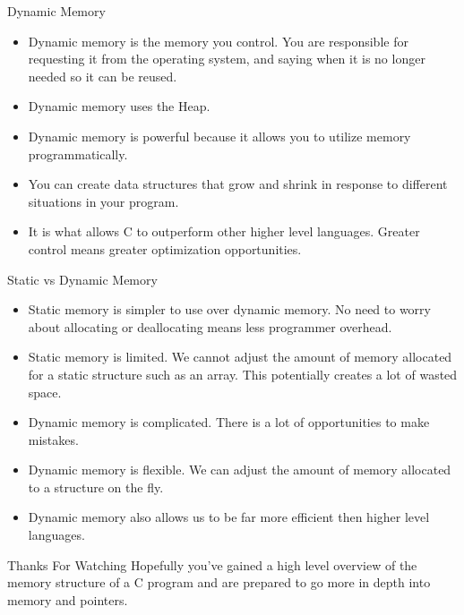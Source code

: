 \documentclass{beamer}
\begin{document}
\begin{frame}{Dynamic Memory}
	\begin{itemize}[<+->]
	\item Dynamic memory is the memory you control. You are responsible for requesting it from the operating system, and saying when it is no longer needed so it can be reused.
	\item Dynamic memory uses the Heap.
	\item Dynamic memory is powerful because it allows you to utilize memory programmatically.
	\item You can create data structures that grow and shrink in response to different situations in your program.
	\item It is what allows C to outperform other higher level languages. Greater control means greater optimization opportunities.
	\end{itemize}
\end{frame}

\begin{frame}{Static vs Dynamic Memory}
	\begin{itemize}
		\item Static memory is simpler to use over dynamic memory. No need to worry about allocating or deallocating means less programmer overhead.
		\item Static memory is limited. We cannot adjust the amount of memory allocated for a static structure such as an array. This potentially creates a lot of wasted space.
		\item Dynamic memory is complicated. There is a lot of opportunities to make mistakes.
		\item Dynamic memory is flexible. We can adjust the amount of memory allocated to a structure on the fly. 
		\item Dynamic memory also allows us to be far more efficient then higher level languages.
	\end{itemize}
\end{frame}

\begin{frame}{Thanks For Watching}
	Hopefully you've gained a high level overview of the memory structure of a C program and are prepared to go more in depth into memory and pointers. 
\end{frame}
\end{document}
